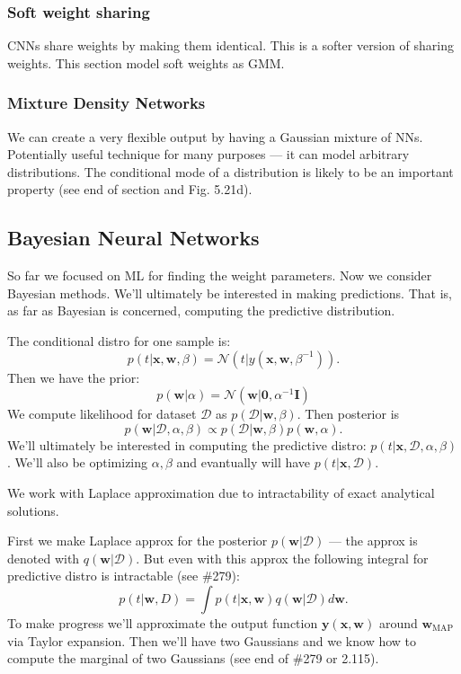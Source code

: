 \documentclass[a4paper]{article}
\newcommand{\mb}{\mathbf}
\newcommand{\rnote}[1]{#1\reversemarginpar\marginpar{{\textit{{\textcolor{red}{#1}}}}}}
\begin{document}
\subsubsection{Soft weight sharing}
CNNs share weights by making them identical. This is a softer version of sharing weights. This section model soft weights as GMM.

\subsubsection{Mixture Density Networks}
We can create a very flexible output by having a Gaussian mixture of NNs. \rnote{Potentially useful} technique for many purposes \---- it can model arbitrary distributions. The conditional mode of a distribution is likely to be an important property (see end of section and Fig. 5.21d).


\subsection{Bayesian Neural Networks}
So far we focused on ML for finding the weight parameters. Now we consider Bayesian methods. We'll ultimately be interested in making predictions. That is, as far as Bayesian is concerned, computing the predictive distribution. 

The conditional distro for one sample is:
%
\begin{equation}
p(t|\mb{x,w},\beta) = \mathcal{N}(t|y(\mb{x,w}, \beta^{-1})).
\end{equation}
%
Then we have the prior:
%
\begin{equation}
p(\mb{w}|\alpha) = \mathcal{N}(\mb{w}|\mb{0}, \alpha^{-1}\mb{I})
\end{equation}
%
We compute likelihood for dataset $\mathcal{D}$ as $p(\mathcal{D}|\mb{w}, \beta)$. Then posterior is
\begin{equation}
p(\mb{w}|\mathcal{D}, \alpha, \beta) \propto p(\mathcal{D}|\mb{w}, \beta)p(\mb{w}, \alpha).
\end{equation}
We'll ultimately be interested in computing the predictive distro: $p(t|\mb{x}, \mathcal{D},\alpha, \beta)$. We'll also be optimizing $\alpha, \beta$ and evantually will have $p(t|\mb{x}, \mathcal{D})$.

We work with Laplace approximation due to intractability of exact analytical solutions.

First we make Laplace approx for the posterior $p(\mb{w}|\mathcal{D})$ \---- the approx is denoted with $q(\mb{w}|\mathcal{D})$. But even with this approx the following integral for predictive distro is intractable (see \#279):
%
\begin{equation}
p(t|\mb{w},D) = \int p(t|\mb{x,w})q(\mb{w}|\mathcal{D})d\mb{w}.
\end{equation}
%
To make progress we'll approximate the output function $\mb{y(x,w)}$ around $\mb{w}_{\text{MAP}}$ via Taylor expansion. Then we'll have two Gaussians and we know how to compute the marginal of two Gaussians (see end of \#279 or 2.115).
\end{document}
